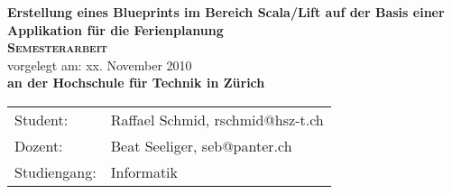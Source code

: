 \begin{titlepage}
    \begin{center}
    \huge \textbf{\textsf{Erstellung eines Blueprints im Bereich Scala/Lift auf der Basis einer Applikation f\"ur die Ferienplanung}} \\
    \vspace{2cm}
    \LARGE\textbf{\textsc{Semesterarbeit}}\\
    \vspace{1cm}
    \normalsize
    vorgelegt am: xx. November 2010 \\
    \vspace{2.5cm}
    \large \textbf{an der Hochschule f\"ur Technik in Z\"urich}\\
    \vspace{5cm}
    \end{center}
 \normalsize{
    \begin{tabular}{ll}
    	Student: &Raffael Schmid, rschmid@hsz-t.ch\\
     	Dozent: & Beat Seeliger, seb@panter.ch \\
    	Studiengang: & Informatik\\
    \end{tabular}\\
    }
\end{titlepage}